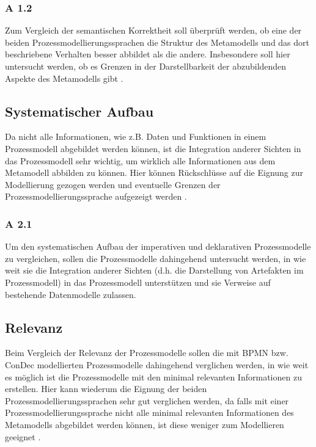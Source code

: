 \subsubsection{A 1.2}

Zum Vergleich der semantischen Korrektheit soll überprüft werden, ob eine der beiden Prozessmodellierungssprachen die Struktur des Metamodells und das dort beschriebene Verhalten besser abbildet als die andere. Insbesondere soll hier untersucht werden, ob es Grenzen in der Darstellbarkeit der abzubildenden Aspekte des Metamodells gibt \cite{journals95, becker2012prozessmanagement}. \newline

\subsection{Systematischer Aufbau}

Da nicht alle Informationen, wie z.B. Daten und Funktionen in einem Prozessmodell abgebildet werden können, ist die Integration anderer Sichten in das Prozessmodell sehr wichtig, um wirklich alle Informationen aus dem Metamodell abbilden zu können. Hier können Rückschlüsse auf die Eignung zur Modellierung gezogen werden und eventuelle Grenzen der Prozessmodellierungssprache aufgezeigt werden \cite{journals95, freund2007, becker2012prozessmanagement,koch2011}.

\subsubsection{A 2.1}
Um den systematischen Aufbau der imperativen und deklarativen Prozessmodelle zu vergleichen, sollen die Prozessmodelle dahingehend untersucht werden, in wie weit sie die Integration anderer Sichten (d.h. die Darstellung von Artefakten im Prozessmodell) in das Prozessmodell unterstützen und sie Verweise auf bestehende Datenmodelle zulassen. 

\subsection{Relevanz}

Beim Vergleich der Relevanz der Prozessmodelle sollen die mit BPMN bzw. ConDec modellierten Prozessmodelle dahingehend verglichen werden, in wie weit es möglich ist die Prozessmodelle mit den minimal relevanten Informationen zu erstellen. Hier kann wiederum die Eignung der beiden Prozessmodellierungssprachen sehr gut verglichen werden, da falls mit einer Prozessmodellierungssprache nicht alle minimal relevanten Informationen des Metamodells abgebildet werden können, ist diese weniger zum Modellieren geeignet \cite{journals95, freund2007,reinshagen2009}. 

